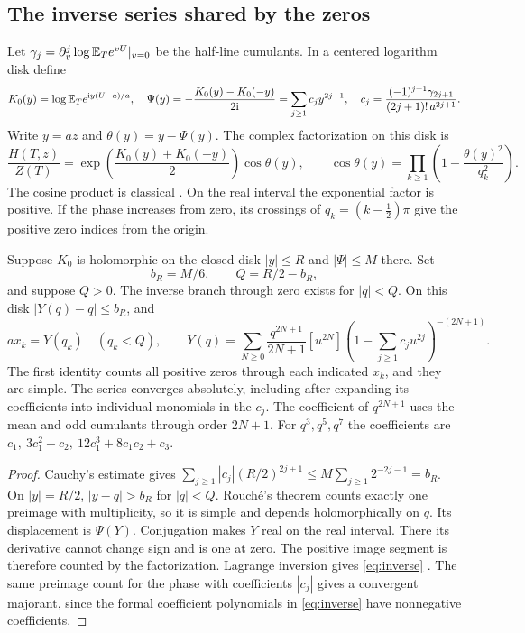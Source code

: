 \subsection{The inverse series shared by the zeros}
Let \(\gamma_j=\partial_v^j\log\mathbb E_T e^{vU}|_{v=0}\) be the half-line cumulants. In a centered logarithm disk define
\begin{equation}
 K_0(y)=\log\mathbb E_T e^{\mathrm i y(U-a)/a},\quad
 \Psi(y)=-\frac{K_0(y)-K_0(-y)}{2\mathrm i}
      =\sum_{j\ge1}c_j y^{2j+1},\quad
 c_j=\frac{(-1)^{j+1}\gamma_{2j+1}}{(2j+1)!\,a^{2j+1}} .
 \label{eq:odd}
\end{equation}
Write \(y=az\) and \(\theta(y)=y-\Psi(y)\). The complex factorization on this disk is
\[
 \frac{H(T,z)}{Z(T)}=\exp\!\left(\frac{K_0(y)+K_0(-y)}2\right)
 \cos\theta(y),\qquad
 \cos\theta(y)=\prod_{k\ge1}\left(1-\frac{\theta(y)^2}{q_k^2}\right).
\]
The cosine product is classical \cite[4.22.2]{DLMF}. On the real interval the exponential factor is positive. If the phase
increases from zero, its crossings of \(q_k=(k-\tfrac12)\pi\) give the
positive zero indices from the origin.

\begin{theorem}\label{thm:inverse}
Suppose \(K_0\) is holomorphic on the closed disk \(|y|\le R\) and
\(|\Psi|\le M\) there. Set
\[
 b_R=M/6,\qquad Q=R/2-b_R,
\]
and suppose \(Q>0\). The inverse branch through zero exists for \(|q|<Q\).
On this disk \(|Y(q)-q|\le b_R\), and
\begin{equation}
 ax_k=Y(q_k)\quad(q_k<Q),\qquad
 Y(q)=\sum_{N\ge0}\frac{q^{2N+1}}{2N+1}
 [u^{2N}]\left(1-\sum_{j\ge1}c_j u^{2j}\right)^{-(2N+1)} .
 \label{eq:inverse}
\end{equation}
The first identity counts all positive zeros through each indicated
\(x_k\), and they are simple. The series converges absolutely, including
after expanding its coefficients into individual monomials in the \(c_j\).
The coefficient of \(q^{2N+1}\) uses the mean and odd cumulants through
order \(2N+1\). For \(q^3,q^5,q^7\) the coefficients are
\(c_1,\ 3c_1^2+c_2,\ 12c_1^3+8c_1c_2+c_3\).
\end{theorem}
\begin{proof}
Cauchy's estimate gives
\(\sum_{j\ge1}|c_j|(R/2)^{2j+1}\le M\sum_{j\ge1}2^{-2j-1}=b_R\).
On \(|y|=R/2\), \(|y-q|>b_R\) for \(|q|<Q\). Rouch\'e's theorem
counts exactly one preimage with multiplicity, so it is simple and
depends holomorphically on \(q\). Its displacement is \(\Psi(Y)\).
Conjugation makes \(Y\) real on the real interval. There its derivative
cannot change sign and is one at zero. The positive image segment is
therefore counted by the factorization. Lagrange inversion gives
\eqref{eq:inverse} \cite[\S1.10(vii)]{DLMF}. The same preimage count for
the phase with coefficients \(|c_j|\) gives a convergent majorant, since
the formal coefficient polynomials in \eqref{eq:inverse} have
nonnegative coefficients.
\end{proof}

